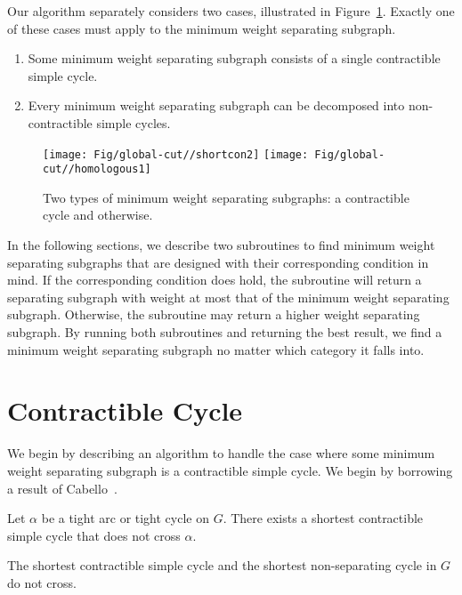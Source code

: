Our algorithm separately considers two cases, illustrated in Figure~\ref{fig:global-cut_cases}. Exactly one of these cases must apply to the minimum weight separating subgraph.
\begin{enumerate}
  \item
    Some minimum weight separating subgraph consists of a single contractible simple cycle.
  \item
    Every minimum weight separating subgraph can be decomposed into non-contractible simple cycles.
\end{enumerate}
%
\begin{figure}[t]
\centering
\texttt{[image: Fig/global-cut//shortcon2]}\qquad
\texttt{[image: Fig/global-cut//homologous1]}
\caption{Two types of minimum weight separating subgraphs: a contractible cycle and otherwise.}
\label{fig:global-cut_cases}
\end{figure}
%

In the following sections, we describe two subroutines to find minimum weight separating subgraphs that are designed with their corresponding condition in mind. If the corresponding condition does hold, the subroutine will return a separating subgraph with weight at most that of the minimum weight separating subgraph. Otherwise, the subroutine may return a higher weight separating subgraph. By running both subroutines and returning the best result, we find a minimum weight separating subgraph no matter which category it falls into.


\section{Contractible Cycle}
\label{sec:global-cut_contractible}

We begin by describing an algorithm to handle the case where some minimum weight separating subgraph is a contractible simple cycle.
We begin by borrowing a result of Cabello~\cite[Lemma 4.1]{c-fscss-10}.

\begin{lemma}
\label{lem:disjoint-tight-arc}
Let $\alpha$ be a tight arc or tight cycle on $G$.  There exists a shortest contractible simple cycle that does not cross $\alpha$.
\end{lemma}

\begin{corollary}
\label{cor:disjoint-sep-cycle}
The shortest contractible simple cycle and the shortest non-separating cycle in $G$ do not cross.
\end{corollary}

